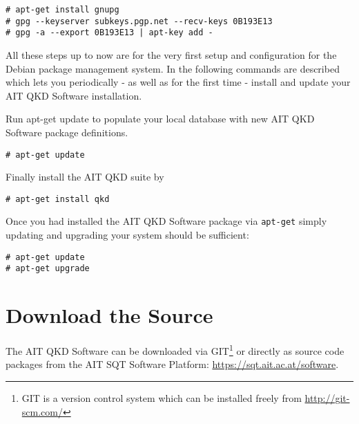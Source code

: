 \begin{minipage}{0.9\textwidth}
\bigskip
\begin{verbatim}
# apt-get install gnupg
# gpg --keyserver subkeys.pgp.net --recv-keys 0B193E13
# gpg -a --export 0B193E13 | apt-key add -
\end{verbatim}
\medskip
\end{minipage}

All these steps up to now are for the very first setup and configuration for the Debian package management system. In the following commands are described which lets you periodically - as well as for the first time - install and update your AIT QKD Software installation.

\medskip

Run apt-get update to populate your local database with new AIT QKD Software package definitions.

\begin{minipage}{0.9\textwidth}
\bigskip
\begin{verbatim}
# apt-get update
\end{verbatim}
\medskip
\end{minipage}

Finally install the AIT QKD suite by

\begin{minipage}{0.9\textwidth}
\bigskip
\begin{verbatim}
# apt-get install qkd
\end{verbatim}
\medskip
\end{minipage}

Once you had installed the AIT QKD Software package via \texttt{apt-get} simply updating and upgrading your system should be sufficient:

\begin{minipage}{0.9\textwidth}
\bigskip
\begin{verbatim}
# apt-get update
# apt-get upgrade
\end{verbatim}
\medskip
\end{minipage}



\section{Download the Source}
\label{sec:Download the Source}

The AIT QKD Software can be downloaded via GIT\footnote{GIT is a version control system which can be installed freely from \url{http://git-scm.com/}} or directly as source code packages from the AIT SQT Software Platform: \url{https://sqt.ait.ac.at/software}. 

